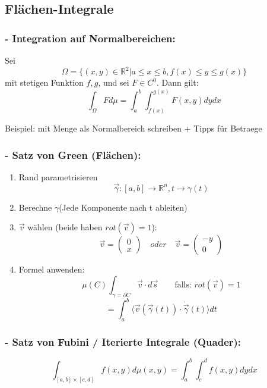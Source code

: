 \documentclass[6pt]{article}
\begin{document}
\begin{multicols*}{3}
		\columnbreak
		\subsection*{Fl{\"a}chen-Integrale}
		
		\subsubsection*{- Integration auf Normalbereichen:}
		Sei
		\[
				\Omega = \{	(x,y) \in \mathbb{R}^2 | a \leq x \leq b, f(x) \leq y \leq g(x)	\}
		\]
		mit stetigen Funktion $f,g$, und sei $F \in C^0$. Dann gilt:
		\[
				\int_{\Omega} F d\mu = \int_{a}^{b} \int_{f(x)}^{g(x)} F(x,y) dy dx
		\]
		
		Beispiel: mit Menge als Normalbereich schreiben + Tipps für Betraege
		
		
		\subsubsection*{- Satz von Green (Fl{\"a}chen):}
		
		\begin{enumerate}
				\item 	Rand parametrisieren
							\[
								\vec{\gamma} : [a,b] \rightarrow \mathbb{R}^n, t \rightarrow \gamma(t)
							\]
				\item 	Berechne $\dot{\gamma}$(Jede Komponente nach t ableiten)
				\item 	$\vec{v}$ w{\"a}hlen (beide haben $rot(\vec{v})=1$):
							\[
										\vec{v} = \begin{pmatrix}0\\x\end{pmatrix}	\quad oder \quad \vec{v} = \begin{pmatrix}-y \\0\end{pmatrix}	
							\]
				\item 	Formel anwenden:
							\[
							   \mu(C) \int_{\gamma = \partial C} \vec{v} \cdot d\vec{s}  \qquad \text{falls: } rot(\vec{v})=1
							\]
							\[
								= \int_{a}^{b} \langle\vec{v}(\vec{\gamma}(t)) \cdot \dot{\vec{\gamma}}(t)\rangle dt 
							\]
		\end{enumerate}

		
		\subsubsection*{- Satz von Fubini / Iterierte Integrale (Quader):}		
		\[
				\int_{[a,b]\times[c,d]} f(x,y) d\mu(x,y) = \int_{a}^{b} \int_{c}^{d} f(x,y) dy  dx
		\]
		

\end{multicols*}
\end{document}
